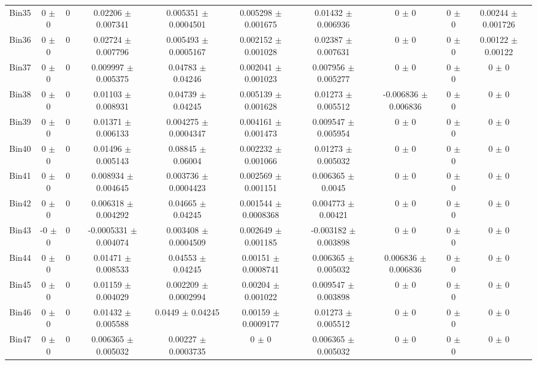 \begin{tabular}{@{\extracolsep{4pt}}lccccccccc@{}}
     Bin35 & 0 $\pm$ 0 & 0 & 0.02206 $\pm$ 0.007341 & 0.005351 $\pm$ 0.0004501 & 0.005298 $\pm$ 0.001675 & 0.01432 $\pm$ 0.006936 & 0 $\pm$ 0 & 0 $\pm$ 0 & 0.00244 $\pm$ 0.001726 \\ 
     Bin36 & 0 $\pm$ 0 & 0 & 0.02724 $\pm$ 0.007796 & 0.005493 $\pm$ 0.0005167 & 0.002152 $\pm$ 0.001028 & 0.02387 $\pm$ 0.007631 & 0 $\pm$ 0 & 0 $\pm$ 0 & 0.00122 $\pm$ 0.00122 \\ 
     Bin37 & 0 $\pm$ 0 & 0 & 0.009997 $\pm$ 0.005375 & 0.04783 $\pm$ 0.04246 & 0.002041 $\pm$ 0.001023 & 0.007956 $\pm$ 0.005277 & 0 $\pm$ 0 & 0 $\pm$ 0 & 0 $\pm$ 0 \\ 
     Bin38 & 0 $\pm$ 0 & 0 & 0.01103 $\pm$ 0.008931 & 0.04739 $\pm$ 0.04245 & 0.005139 $\pm$ 0.001628 & 0.01273 $\pm$ 0.005512 & -0.006836 $\pm$ 0.006836 & 0 $\pm$ 0 & 0 $\pm$ 0 \\ 
     Bin39 & 0 $\pm$ 0 & 0 & 0.01371 $\pm$ 0.006133 & 0.004275 $\pm$ 0.0004347 & 0.004161 $\pm$ 0.001473 & 0.009547 $\pm$ 0.005954 & 0 $\pm$ 0 & 0 $\pm$ 0 & 0 $\pm$ 0 \\ 
     Bin40 & 0 $\pm$ 0 & 0 & 0.01496 $\pm$ 0.005143 & 0.08845 $\pm$ 0.06004 & 0.002232 $\pm$ 0.001066 & 0.01273 $\pm$ 0.005032 & 0 $\pm$ 0 & 0 $\pm$ 0 & 0 $\pm$ 0 \\ 
     Bin41 & 0 $\pm$ 0 & 0 & 0.008934 $\pm$ 0.004645 & 0.003736 $\pm$ 0.0004423 & 0.002569 $\pm$ 0.001151 & 0.006365 $\pm$ 0.0045 & 0 $\pm$ 0 & 0 $\pm$ 0 & 0 $\pm$ 0 \\ 
     Bin42 & 0 $\pm$ 0 & 0 & 0.006318 $\pm$ 0.004292 & 0.04665 $\pm$ 0.04245 & 0.001544 $\pm$ 0.0008368 & 0.004773 $\pm$ 0.00421 & 0 $\pm$ 0 & 0 $\pm$ 0 & 0 $\pm$ 0 \\ 
     Bin43 & -0 $\pm$ 0 & 0 & -0.0005331 $\pm$ 0.004074 & 0.003408 $\pm$ 0.0004509 & 0.002649 $\pm$ 0.001185 & -0.003182 $\pm$ 0.003898 & 0 $\pm$ 0 & 0 $\pm$ 0 & 0 $\pm$ 0 \\ 
     Bin44 & 0 $\pm$ 0 & 0 & 0.01471 $\pm$ 0.008533 & 0.04553 $\pm$ 0.04245 & 0.00151 $\pm$ 0.0008741 & 0.006365 $\pm$ 0.005032 & 0.006836 $\pm$ 0.006836 & 0 $\pm$ 0 & 0 $\pm$ 0 \\ 
     Bin45 & 0 $\pm$ 0 & 0 & 0.01159 $\pm$ 0.004029 & 0.002209 $\pm$ 0.0002994 & 0.00204 $\pm$ 0.001022 & 0.009547 $\pm$ 0.003898 & 0 $\pm$ 0 & 0 $\pm$ 0 & 0 $\pm$ 0 \\ 
     Bin46 & 0 $\pm$ 0 & 0 & 0.01432 $\pm$ 0.005588 & 0.0449 $\pm$ 0.04245 & 0.00159 $\pm$ 0.0009177 & 0.01273 $\pm$ 0.005512 & 0 $\pm$ 0 & 0 $\pm$ 0 & 0 $\pm$ 0 \\ 
     Bin47 & 0 $\pm$ 0 & 0 & 0.006365 $\pm$ 0.005032 & 0.00227 $\pm$ 0.0003735 & 0 $\pm$ 0 & 0.006365 $\pm$ 0.005032 & 0 $\pm$ 0 & 0 $\pm$ 0 & 0 $\pm$ 0 \\ 

\end{tabular}
